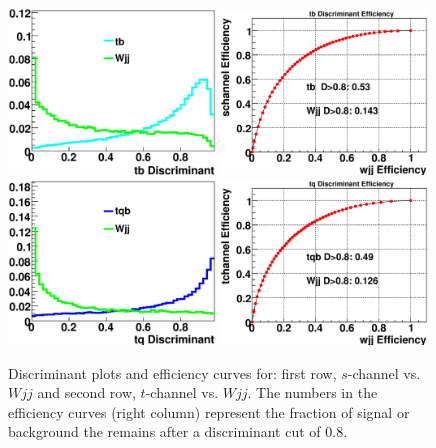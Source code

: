 \begin{figure}[!h!tbp]
\includegraphics[width=0.49\textwidth]
{eps/MatrixElement/performance/tb_Discriminant__schannel_wjj}
\includegraphics[width=0.49\textwidth]
{eps/MatrixElement/performance/tb_Efficiency__schannel_wjj}
\includegraphics[width=0.49\textwidth]
{eps/MatrixElement/performance/tq_Discriminant__tchannel_wjj}
\includegraphics[width=0.49\textwidth]
{eps/MatrixElement/performance/tq_Efficiency__tchannel_wjj}
\caption{Discriminant plots and efficiency curves for:
first row, $s$-channel vs. $Wjj$ and second row, $t$-channel
vs. $Wjj$. The numbers in the
efficiency curves (right column) represent the fraction of signal or
background the remains after a discriminant cut of 0.8.}
\label{disc_wjj}
\end{figure}

